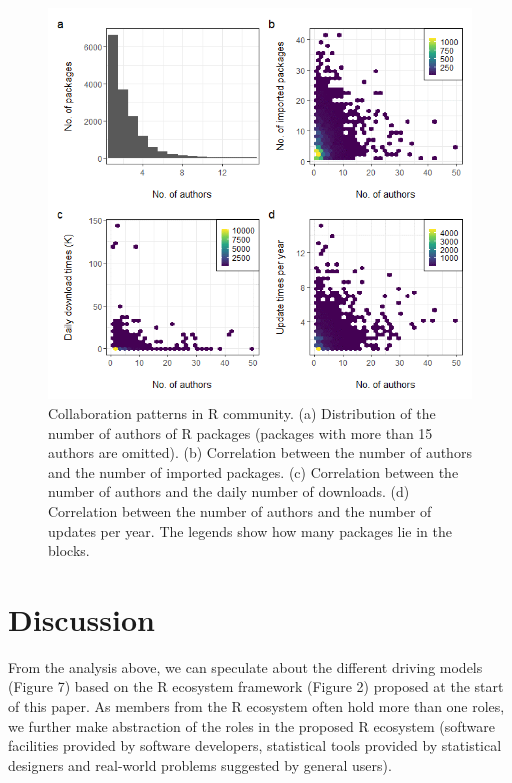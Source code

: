 \begin{Schunk}
\begin{figure}
\includegraphics[width=1\linewidth,height=0.3\textheight]{fig6} \caption[Collaboration patterns in R community]{Collaboration patterns in R community. (a) Distribution of the number of authors of R packages (packages with more than 15 authors are omitted). (b) Correlation between the number of authors and the number of imported packages. (c) Correlation between the number of authors and the daily number of downloads. (d) Correlation between the number of authors and the number of updates per year. The legends show how many packages lie in the blocks. }\label{fig:fig6}
\end{figure}
\end{Schunk}

\hypertarget{discussion}{%
\section{Discussion}\label{discussion}}

From the analysis above, we can speculate about the different driving
models (Figure 7) based on the R ecosystem framework (Figure 2) proposed
at the start of this paper. As members from the R ecosystem often hold
more than one roles, we further make abstraction of the roles in the
proposed R ecosystem (software facilities provided by software
developers, statistical tools provided by statistical designers and
real-world problems suggested by general users).

